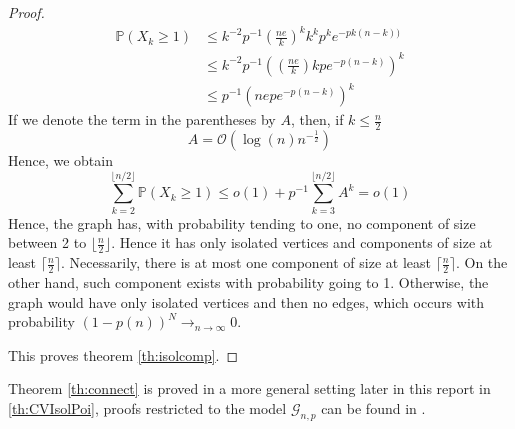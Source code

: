 \begin{proof}
\begin{align}
	\mathbb{P}(X_k \geq 1) 	
	            &\leq k^{-2}p^{-1}(\frac{ne}{k})^k k^{k} p^{k} e^{-pk(n-k))}\\
			   &\leq k^{-2}p^{-1}((\frac{ne}{k}) k p e^{-p(n-k)})^k\\
			   &\leq p^{-1}(nep e^{-p(n-k)})^k
\end{align}
If we denote the term in the parentheses by $A$, then, if $k \leq \frac{n}{2}$
\begin{equation}
    A = \mathcal{O}(\log(n) n^{-\frac{1}{2}})
\end{equation}
Hence, we obtain
\begin{equation}
	\sum_{k=2}^{\lfloor n/2\rfloor} \mathbb{P}(X_k \geq 1)\leq o(1) + p^{-1}\sum_{k=3}^{\lfloor n/2\rfloor} A^k = o(1)
\end{equation}
Hence, the graph has, with probability tending to one, no component of size between 2 to $\lfloor \frac{n}{2} \rfloor$.
Hence it has only isolated vertices and components of size at least $\lceil \frac{n}{2} \rceil$.
Necessarily, there is at most one component of size at least $\lceil \frac{n}{2} \rceil$.
\newline
On the other hand, such component exists with probability going to 1. Otherwise, the graph would have only isolated vertices and then no edges, which occurs with probability $(1-p(n))^N \longrightarrow_{n\to \infty} 0$.

This proves theorem \eqref{th:isolcomp}.
\end{proof}

Theorem \eqref{th:connect} is proved in a more general setting later in this report in \ref{th:CVIsolPoi}, proofs restricted to the model $\mathcal{G}_{n,p}$ can be found in \cite{JLR}.


